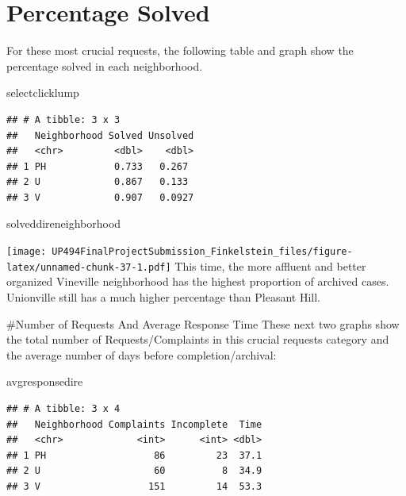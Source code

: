 \documentclass[
]{article}
\newenvironment{Shaded}{\begin{snugshade}}{\end{snugshade}}
\newcommand{\NormalTok}[1]{#1}
\begin{document}
\hypertarget{percentage-solved}{%
\section{Percentage Solved}\label{percentage-solved}}

For these most crucial requests, the following table and graph show the
percentage solved in each neighborhood.

\begin{Shaded}
\begin{Highlighting}[]
\NormalTok{ selectclicklump}
\end{Highlighting}
\end{Shaded}

\begin{verbatim}
## # A tibble: 3 x 3
##   Neighborhood Solved Unsolved
##   <chr>         <dbl>    <dbl>
## 1 PH            0.733   0.267 
## 2 U             0.867   0.133 
## 3 V             0.907   0.0927
\end{verbatim}

\begin{Shaded}
\begin{Highlighting}[]
\NormalTok{solveddireneighborhood}
\end{Highlighting}
\end{Shaded}

\texttt{[image: UP494FinalProjectSubmission\_Finkelstein\_files/figure-latex/unnamed-chunk-37-1.pdf]}
This time, the more affluent and better organized Vineville neighborhood
has the highest proportion of archived cases. Unionville still has a
much higher percentage than Pleasant Hill.

\#Number of Requests And Average Response Time These next two graphs
show the total number of Requests/Complaints in this crucial requests
category and the average number of days before completion/archival:

\begin{Shaded}
\begin{Highlighting}[]
\NormalTok{avgresponsedire}
\end{Highlighting}
\end{Shaded}

\begin{verbatim}
## # A tibble: 3 x 4
##   Neighborhood Complaints Incomplete  Time
##   <chr>             <int>      <int> <dbl>
## 1 PH                   86         23  37.1
## 2 U                    60          8  34.9
## 3 V                   151         14  53.3
\end{verbatim}
\end{document}
